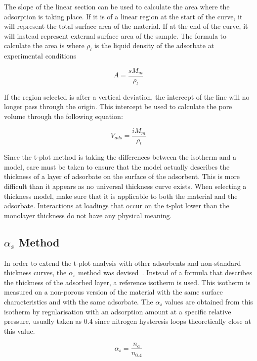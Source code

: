 The slope of the linear section can be used to calculate the area where
the adsorption is taking place. If it is of a linear region at the start
of the curve, it will represent the total surface area of the material.
If at the end of the curve, it will instead represent external surface
area of the sample. The formula to calculate the area is
where \(\rho_{l}\) is the liquid density of the adsorbate at experimental
conditions

\begin{equation}
	A = \frac{s M_m}{\rho_{l}}
\end{equation}


If the region selected is after a vertical deviation, the intercept of the line
will no longer pass through the origin. This intercept be used to calculate the
pore volume through the following equation:

\begin{equation}
	V_{ads} = \frac{i M_m}{\rho_{l}}
\end{equation}


Since the t-plot method is taking the differences between the
isotherm and a model, care must be taken to ensure that the model
actually describes the thickness of a layer of adsorbate on the
surface of the adsorbent. This is more difficult than it
appears as no universal thickness curve exists.
When selecting a thickness model, make sure that it is applicable
to both the material and the adsorbate.
Interactions at loadings that occur on the t-plot lower than the monolayer
thickness do not have any physical meaning.

\subsection{\(\alpha_s\) Method}

In order to extend the t-plot analysis with other adsorbents and non-standard
thickness curves, the \(\alpha_s\) method was 
devised~\cite{atkinsonAdsorptivePropertiesMicroporous1984}.
Instead of a formula that describes the thickness of the adsorbed layer, 
a reference isotherm is used. This isotherm is measured on a non-porous 
version of the material with the same surface characteristics and with 
the same adsorbate.
The \(\alpha_s\) values are obtained from this isotherm by regularisation with
an adsorption amount at a specific relative pressure, usually taken as 0.4 since
nitrogen hysteresis loops theoretically close at this value.

\begin{equation}
	\alpha_s = \frac{n_a}{n_{0.4}}
\end{equation}

